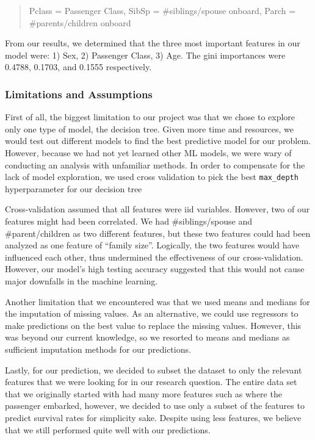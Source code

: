 \documentclass[]{article}
\begin{document}
\begin{quote}
Pclass = Passenger Class, SibSp = \#siblings/spouse onboard, Parch =
\#parents/children onboard
\end{quote}

From our results, we determined that the three most important features
in our model were: 1) Sex, 2) Passenger Class, 3) Age. The gini
importances were 0.4788, 0.1703, and 0.1555 respectively.

\subsubsection{Limitations and
Assumptions}\label{limitations-and-assumptions}

First of all, the biggest limitation to our project was that we chose to
explore only one type of model, the decision tree. Given more time and
resources, we would test out different models to find the best
predictive model for our problem. However, because we had not yet
learned other ML models, we were wary of conducting an analysis with
unfamiliar methods. In order to compensate for the lack of model
exploration, we used cross validation to pick the best
\texttt{max\_depth} hyperparameter for our decision tree

Cross-validation assumed that all features were iid variables. However,
two of our features might had been correlated. We had \#siblings/spouse
and \#parent/children as two different features, but these two features
could had been analyzed as one feature of ``family size''. Logically,
the two features would have influenced each other, thus undermined the
effectiveness of our cross-validation. However, our model's high testing
accuracy suggested that this would not cause major downfalls in the
machine learning.

Another limitation that we encountered was that we used means and
medians for the imputation of missing values. As an alternative, we
could use regressors to make predictions on the best value to replace
the missing values. However, this was beyond our current knowledge, so
we resorted to means and medians as sufficient imputation methods for
our predictions.

Lastly, for our prediction, we decided to subset the dataset to only the
relevant features that we were looking for in our research question. The
entire data set that we originally started with had many more features
such as where the passenger embarked, however, we decided to use only a
subset of the features to predict survival rates for simplicity sake.
Despite using less features, we believe that we still performed quite
well with our predictions.
\end{document}

